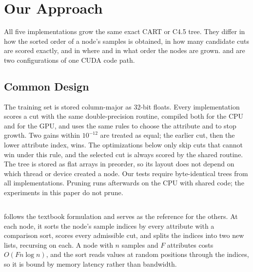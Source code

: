 \section{Our Approach}
\label{sec:impl}

All five implementations grow the same exact CART or C4.5 tree. They differ in how the sorted order of a node's samples is obtained, in how many candidate cuts are scored exactly, and in where and in what order the nodes are grown. \ImplGpu{} and \ImplHybrid{} are two configurations of one CUDA code path.

\subsection{Common Design}
\label{sec:impl-common}

The training set is stored column-major as 32-bit floats. Every implementation scores a cut with the same double-precision routine, compiled both for the CPU and for the GPU, and uses the same rules to choose the attribute and to stop growth. Two gains within $10^{-12}$ are treated as equal; the earlier cut, then the lower attribute index, wins. The optimizations below only skip cuts that cannot win under this rule, and the selected cut is always scored by the shared routine. The tree is stored as flat arrays in preorder, so its layout does not depend on which thread or device created a node. Our tests require byte-identical trees from all implementations. Pruning runs afterwards on the CPU with shared code; the experiments in this paper do not prune.

\subsection{\ImplSerialBase}
\label{sec:impl-simple}

\ImplSerialBase{} follows the textbook formulation and serves as the reference for the others. At each node, it sorts the node's sample indices by every attribute with a comparison sort, scores every admissible cut, and splits the indices into two new lists, recursing on each. A node with $n$ samples and $F$ attributes costs $O(Fn\log n)$, and the sort reads values at random positions through the indices, so it is bound by memory latency rather than bandwidth.

\subsection{\ImplSerialOpt}
\label{sec:impl-serial}

